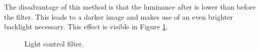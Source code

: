 The disadvantage of this method is that the luminance after is lower than before the filter.
This leads to a darker image and makes use of an even brighter backlight necessary.
This effect is visible in Figure \ref{theory:filtercompare}.
\begin{figure}[ht]
	\centering
	\caption{Light control filter.\label{theory:filtercompare}}	
\end{figure}

